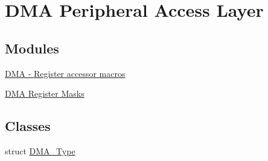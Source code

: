 \hypertarget{group__DMA__Peripheral__Access__Layer}{}\section{D\+MA Peripheral Access Layer}
\label{group__DMA__Peripheral__Access__Layer}
\subsection*{Modules}
\begin{DoxyCompactItemize}
\item 
\hyperlink{group__DMA__Register__Accessor__Macros}{D\+M\+A -\/ Register accessor macros}
\item 
\hyperlink{group__DMA__Register__Masks}{D\+M\+A Register Masks}
\end{DoxyCompactItemize}
\subsection*{Classes}
\begin{DoxyCompactItemize}
\item 
struct \hyperlink{structDMA__Type}{D\+M\+A\+\_\+\+Type}
\end{DoxyCompactItemize}
